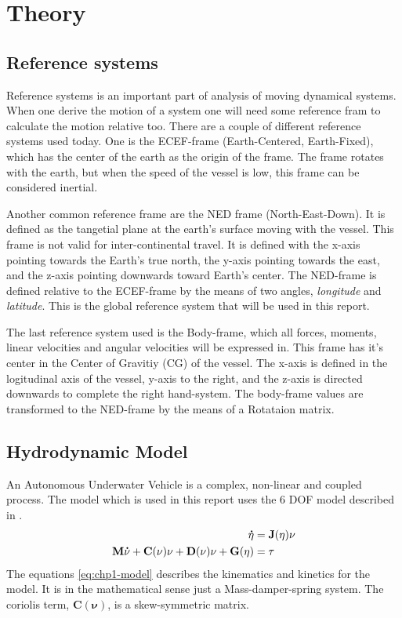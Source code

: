 \chapter{Theory}
	
\section{Reference systems}
	Reference systems is an important part of analysis of moving dynamical systems. When one derive the motion of a system one will need some reference fram to calculate the motion relative too. There are a couple of different reference systems used today. One is the ECEF-frame (Earth-Centered, Earth-Fixed), which has the center of the earth as the origin of the frame. The frame rotates with the earth, but when the speed of the vessel is low, this frame can be considered inertial. \cite{forsell}
	
	Another common reference frame are the NED frame (North-East-Down). It is defined as the tangetial plane at the earth's surface moving with the vessel. This frame is not valid for inter-continental travel. It is defined with the x-axis pointing towards the Earth's true north, the y-axis pointing towards the east, and the z-axis pointing downwards toward Earth's center. The NED-frame is defined relative to the ECEF-frame by the means of two angles, \textit{longitude} and \textit{latitude}. This is the global reference system that will be used in this report. \cite{fossen}
	
	The last reference system used is the Body-frame, which all forces, moments, linear velocities and angular velocities will be expressed in. This frame has it's center in the Center of Gravitiy (CG) of the vessel. The x-axis is defined in the logitudinal axis of the vessel, y-axis to the right, and the z-axis is directed downwards to complete the right hand-system. The body-frame values are transformed to the NED-frame by the means of a Rotataion matrix.
	
	

\section{Hydrodynamic Model}
	An Autonomous Underwater Vehicle is a complex, non-linear and coupled process. The model which is used in this report uses the 6 DOF model described in \cite{fossen}.
		\begin{align}
			\label{eq:chp1-model}
			\mathbf{\dot{\eta}} &= \mathbf{J}(\mathbf{\eta}) \mathbf{\nu} \\
			\mathbf{M}\mathbf{\dot{\nu}} + \mathbf{C}(\mathbf{\nu})\mathbf{\nu} + \mathbf{D}(\mathbf{\nu})\mathbf{\nu} + \mathbf{G}(\mathbf{\eta}) &= \mathbf{\tau}
		\end{align}
	The equations \eqref{eq:chp1-model} describes the kinematics and kinetics for the model. It is in the mathematical sense just a Mass-damper-spring system. The coriolis term, $\mathbf{C}(\mathbf{\nu})$, is a skew-symmetric matrix.
	
